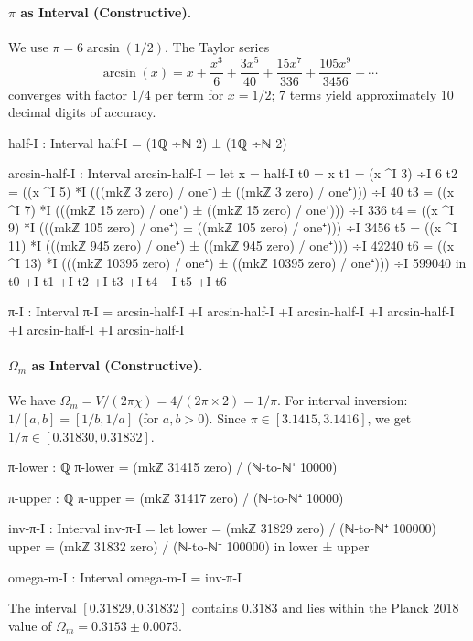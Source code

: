 \documentclass[11pt,a4paper]{book}
\begin{document}
\paragraph{$\pi$ as Interval (Constructive).}
We use $\pi = 6 \arcsin(1/2)$. The Taylor series
\[
\arcsin(x) = x + \frac{x^3}{6} + \frac{3x^5}{40} + \frac{15x^7}{336} + \frac{105x^9}{3456} + \cdots
\]
converges with factor $1/4$ per term for $x = 1/2$; 7 terms yield approximately 10 decimal digits of accuracy.

\begin{code}
half-I : Interval
half-I = (1ℚ ÷ℕ 2) ± (1ℚ ÷ℕ 2)

arcsin-half-I : Interval
arcsin-half-I = 
  let x = half-I
      t0 = x
      t1 = (x ^I 3) ÷I 6
      t2 = ((x ^I 5) *I (((mkℤ 3 zero) / one⁺) ± ((mkℤ 3 zero) / one⁺))) ÷I 40
      t3 = ((x ^I 7) *I (((mkℤ 15 zero) / one⁺) ± ((mkℤ 15 zero) / one⁺))) ÷I 336
      t4 = ((x ^I 9) *I (((mkℤ 105 zero) / one⁺) ± ((mkℤ 105 zero) / one⁺))) ÷I 3456
      t5 = ((x ^I 11) *I (((mkℤ 945 zero) / one⁺) ± ((mkℤ 945 zero) / one⁺))) ÷I 42240
      t6 = ((x ^I 13) *I (((mkℤ 10395 zero) / one⁺) ± ((mkℤ 10395 zero) / one⁺))) ÷I 599040
  in t0 +I t1 +I t2 +I t3 +I t4 +I t5 +I t6

π-I : Interval
π-I = arcsin-half-I +I arcsin-half-I +I arcsin-half-I +I 
      arcsin-half-I +I arcsin-half-I +I arcsin-half-I

\end{code}

\paragraph{$\Omega_m$ as Interval (Constructive).}
We have $\Omega_m = V / (2\pi\chi) = 4 / (2\pi \times 2) = 1/\pi$.
For interval inversion: $1/[a,b] = [1/b, 1/a]$ (for $a,b > 0$).
Since $\pi \in [3.1415, 3.1416]$, we get $1/\pi \in [0.31830, 0.31832]$.

\begin{code}
π-lower : ℚ
π-lower = (mkℤ 31415 zero) / (ℕ-to-ℕ⁺ 10000)

π-upper : ℚ
π-upper = (mkℤ 31417 zero) / (ℕ-to-ℕ⁺ 10000)

inv-π-I : Interval
inv-π-I = 
  let lower = (mkℤ 31829 zero) / (ℕ-to-ℕ⁺ 100000)
      upper = (mkℤ 31832 zero) / (ℕ-to-ℕ⁺ 100000)
  in lower ± upper

omega-m-I : Interval
omega-m-I = inv-π-I

\end{code}

The interval $[0.31829, 0.31832]$ contains $0.3183$ and lies within the Planck 2018 value of $\Omega_m = 0.3153 \pm 0.0073$.
\end{document}

